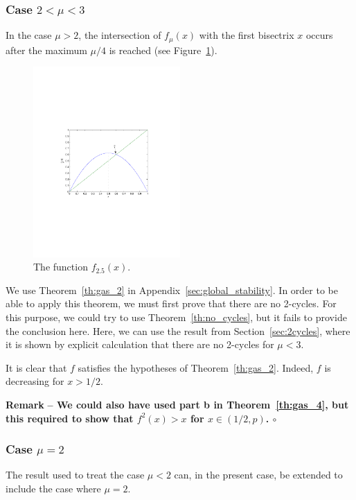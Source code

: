 \documentclass[12pt]{article}
\theoremstyle{plain}
\newenvironment{remark}{\vskip0.2cm\par\noindent\begin{small}\bf Remark\,\,\rm --}{\hfill{$\circ$}\end{small}\par\vskip0.25cm}
\begin{document}
\subsubsection{Case $2<\mu<3$}
In the case $\mu>2$, the intersection of $f_\mu(x)$ with the first bisectrix $x$ occurs after the maximum $\mu/4$ is reached (see Figure~\ref{fig:logistic_2dot5}).
\begin{figure}[htbp]
\begin{center}
\includegraphics[width=0.5\textwidth]{logistic_2dot5}
\end{center}
\caption{The function $f_{2.5}(x)$.}\label{fig:logistic_2dot5}
\end{figure}
We use Theorem~\ref{th:gas_2} in Appendix~\ref{sec:global_stability}. In order to be able to apply this theorem, we must first prove that there are no 2-cycles. For this purpose, we could try to use Theorem~\ref{th:no_cycles}, but it fails to provide the conclusion here. Here, we can use the result from Section~\ref{sec:2cycles}, where it is shown by explicit calculation that there are no 2-cycles for $\mu<3$.

It is clear that $f$ satisfies the hypotheses of Theorem~\ref{th:gas_2}. Indeed, $f$ is decreasing for $x>1/2$.

\begin{remark}
We could also have used part {\bf b} in Theorem~\ref{th:gas_4}, but this required to show that $f^2(x)>x$ for $x\in(1/2,p)$.
\end{remark}


\subsubsection{Case $\mu=2$}
The result used to treat the case $\mu<2$ can, in the present case, be extended to include the case where $\mu=2$.
\end{document}
